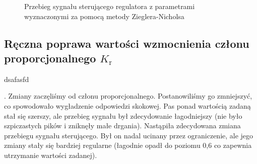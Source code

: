 \begin{figure}[t]
    \centering
    \caption{Przebieg sygnału sterującego regulatora z parametrami wyznaczonymi za pomocą metody Zieglera-Nicholsa}
    \label{zad5_zn_sterowanie}
\end{figure}
\FloatBarrier

\subsection{Ręczna poprawa wartości wzmocnienia członu proporcjonalnego $K_{\mathrm{r}}$ }

dsafasfd
























































\iffalse
{}. Zmiany zaczęliśmy od członu proporcjonalnego. Postanowiliśmy go zmniejszyć, co spowodowało wygładzenie odpowiedzi skokowej. Pas ponad wartością zadaną stał się szerszy, ale przebieg sygnału był zdecydowanie łagodniejszy (nie było szpiczastych pików i zniknęły małe drgania). Nastąpiła zdecydowana zmiana przebiegu sygnału sterującego. Był on nadal ucinany przez ograniczenie, ale jego zmiany stały się bardziej regularne (łagodnie opadł do poziomu 0,6 co zapewnia utrzymanie wartości zadanej).

